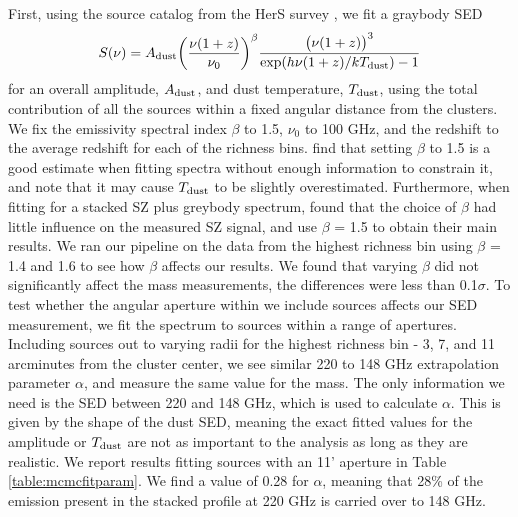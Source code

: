 \documentclass[a4paper,fleqn,usenatbib]{mnras}
\begin{document}
First, using the source catalog from the HerS survey \citep{2014ApJS..210...22V}, we fit a graybody SED 
\begin{equation}
  \label{eq:dustSED}
  \centering
  S(\nu) = A_{\rm dust}  \bigg(\frac{\nu(1+z)}{\nu_0}\bigg)^{\beta} \frac{\big(\nu(1+z)\big)^{3} }{{\exp({h \nu (1+z) / k T_{\rm dust}}) - 1}}
\end{equation}
for an overall amplitude, $A_{\rm dust}$, and dust temperature, $T_{\rm dust}$, using the total contribution of all the sources within a fixed angular distance from the clusters. We fix the emissivity spectral index $\beta$ to 1.5, $\nu_0$ to 100 GHz, and the redshift to the average redshift for each of the richness bins. \cite{2014A&A...561A..86M} find that setting $\beta$ to 1.5 is a good estimate when fitting spectra without enough information to constrain it, and note that it may cause $T_{\rm dust}$ to be slightly overestimated. Furthermore, when fitting for a stacked SZ plus greybody spectrum, \cite{2017arXiv170901187E} found that the choice of $\beta$ had little influence on the measured SZ signal, and use $\beta$ = 1.5 to obtain their main results. We ran our pipeline on the data from the highest richness bin using $\beta$ = 1.4 and 1.6 to see how $\beta$ affects our results. We found that varying $\beta$ did not significantly affect the mass measurements, the differences were less than 0.1$\sigma$. To test whether the angular aperture within we include sources affects our SED measurement, we fit the spectrum to sources within a range of apertures. Including sources out to varying radii for the highest richness bin - 3, 7, and 11 arcminutes from the cluster center, we see similar 220 to 148 GHz extrapolation parameter $\alpha$, and measure the same value for the mass. The only information we need is the SED between 220 and 148 GHz, which is used to calculate $\alpha$. This is given by the shape of the dust SED, meaning the exact fitted values for the amplitude or $T_{\rm dust}$ are not as important to the analysis as long as they are realistic. 
We report results fitting sources with an 11' aperture in Table \ref{table:mcmcfitparam}. We find a value of 0.28 for $\alpha$, meaning that 28\% of the emission present in the stacked profile at 220 GHz is carried over to 148 GHz.
\end{document}
